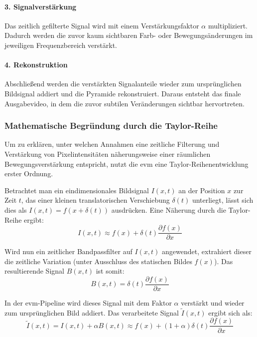 \paragraph{3. Signalverstärkung} 
Das zeitlich gefilterte Signal wird mit einem Verstärkungsfaktor $\alpha$ multipliziert. Dadurch werden die zuvor kaum sichtbaren Farb- oder Bewegungsänderungen im jeweiligen Frequenzbereich verstärkt.

\paragraph{4. Rekonstruktion} 
Abschließend werden die verstärkten Signalanteile wieder zum ursprünglichen Bildsignal addiert und die Pyramide rekonstruiert. Daraus entsteht das finale Ausgabevideo, in dem die zuvor subtilen Veränderungen sichtbar hervortreten.

\subsubsection{Mathematische Begründung durch die Taylor-Reihe}
Um zu erklären, unter welchen Annahmen eine zeitliche Filterung und Verstärkung von Pixelintensitäten näherungsweise einer räumlichen Bewegungsverstärkung entspricht, nutzt die \ac{evm} eine Taylor-Reihenentwicklung erster Ordnung.

Betrachtet man ein eindimensionales Bildsignal $I(x, t)$ an der Position $x$ zur Zeit $t$, das einer kleinen translatorischen Verschiebung $\delta(t)$ unterliegt, lässt sich dies als $I(x, t) = f(x + \delta(t))$ ausdrücken. Eine Näherung durch die Taylor-Reihe ergibt:
\begin{equation}
I(x, t) \approx f(x) + \delta(t)\frac{\partial f(x)}{\partial x}
\end{equation}

Wird nun ein zeitlicher Bandpassfilter auf $I(x, t)$ angewendet, extrahiert dieser die zeitliche Variation (unter Ausschluss des statischen Bildes $f(x)$). Das resultierende Signal $B(x, t)$ ist somit:
\begin{equation}
B(x, t) = \delta(t)\frac{\partial f(x)}{\partial x}
\end{equation}

In der \ac{evm}-Pipeline wird dieses Signal mit dem Faktor $\alpha$ verstärkt und wieder zum ursprünglichen Bild addiert. Das verarbeitete Signal $\tilde{I}(x, t)$ ergibt sich als:
\begin{equation}
\tilde{I}(x, t) = I(x, t) + \alpha B(x, t) \approx f(x) + (1 + \alpha)\delta(t)\frac{\partial f(x)}{\partial x}
\end{equation}


